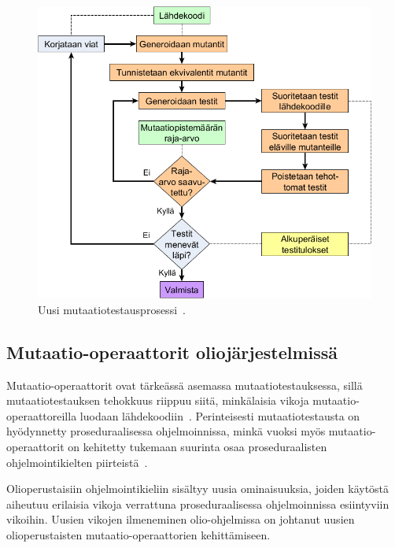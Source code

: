\documentclass[finnish, grading]{tktltiki2}
\theoremstyle{definition}
\theoremstyle{remark}
\begin{document}
\begin{figure}[H]
	\centering
		\includegraphics[width=\textwidth]{uusiprosessi}
	\caption{Uusi mutaatiotestausprosessi~\cite[s. 41]{Offutt:Untch:2001}.}
	\label{figure:UusiMutaatiotestausprosessi}
\end{figure}


\subsection{Mutaatio-operaattorit oliojärjestelmissä}



Mutaatio-operaattorit ovat tärkeässä asemassa mutaatiotestauksessa, sillä mutaatiotestauksen tehokkuus riippuu siitä, minkälaisia vikoja mutaatio-operaattoreilla luodaan lähdekoodiin~\cite[s. 352]{Ma:Kwon:Offutt:2002}. Perinteisesti mutaatiotestausta on hyödynnetty proseduraalisessa ohjelmoinnissa, minkä vuoksi myös mutaatio-operaattorit on kehitetty tukemaan suurinta osaa proseduraalisten ohjelmointikielten piirteistä~\cite[s. 352]{Ma:Kwon:Offutt:2002}. 

Olioperustaisiin ohjelmointikieliin sisältyy uusia ominaisuuksia, joiden käytöstä aiheutuu erilaisia vikoja verrattuna proseduraalisessa ohjelmoinnissa esiintyviin vikoihin. Uusien vikojen ilmeneminen olio-ohjelmissa on johtanut uusien olioperustaisten mutaatio-operaattorien kehittämiseen.  
\end{document}
